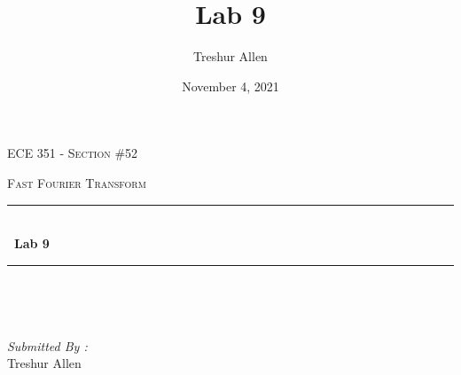 \documentclass[12pt]{report}
\title{Lab 9}
\author{ Treshur Allen}
\date{November 4, 2021}
\begin{document}

\begin{titlepage}
	\centering
    \vspace*{0.5 cm}
\begin{center}    \textsc{\Large   ECE 351 - Section \#52 }\\[2.0 cm]	\end{center}%
	\textsc{\Large Fast Fourier Transform  }\\[0.5 cm]				%
	\rule{\linewidth}{0.2 mm} \\[0.4 cm]
	{ \huge \bfseries \ Lab 9}\\
	\rule{\linewidth}{0.2 mm} \\[1.5 cm]
	
	\begin{minipage}{0.4\textwidth}
		\begin{flushleft} \large
			\end{flushleft}
			\end{minipage}~
			\begin{minipage}{0.4\textwidth}
            
			\begin{flushright} \large
			\emph{Submitted By :} \\
			Treshur Allen  
		\end{flushright}
           
	\end{minipage}\\[2 cm]
	
    
    
    
    
	
\end{titlepage}


\tableofcontents
\pagebreak

\renewcommand{\thesection}{\arabic{section}}
\end{document}
